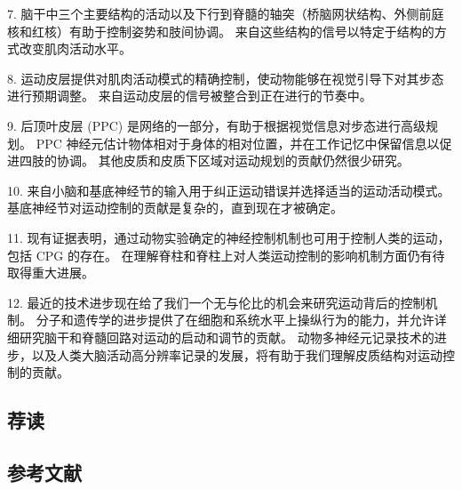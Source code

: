7. 脑干中三个主要结构的活动以及下行到脊髓的轴突（桥脑网状结构、外侧前庭核和红核）有助于控制姿势和肢间协调。 来自这些结构的信号以特定于结构的方式改变肌肉活动水平。 

8. 运动皮层提供对肌肉活动模式的精确控制，使动物能够在视觉引导下对其步态进行预期调整。 来自运动皮层的信号被整合到正在进行的节奏中。

9. 后顶叶皮层 (PPC) 是网络的一部分，有助于根据视觉信息对步态进行高级规划。 PPC 神经元估计物体相对于身体的相对位置，并在工作记忆中保留信息以促进四肢的协调。 其他皮质和皮质下区域对运动规划的贡献仍然很少研究。 

10. 来自小脑和基底神经节的输入用于纠正运动错误并选择适当的运动活动模式。 基底神经节对运动控制的贡献是复杂的，直到现在才被确定。 

11. 现有证据表明，通过动物实验确定的神经控制机制也可用于控制人类的运动，包括 CPG 的存在。 在理解脊柱和脊柱上对人类运动控制的影响机制方面仍有待取得重大进展。 

12. 最近的技术进步现在给了我们一个无与伦比的机会来研究运动背后的控制机制。 分子和遗传学的进步提供了在细胞和系统水平上操纵行为的能力，并允许详细研究脑干和脊髓回路对运动的启动和调节的贡献。 动物多神经元记录技术的进步，以及人类大脑活动高分辨率记录的发展，将有助于我们理解皮质结构对运动控制的贡献。

\subsection{荐读}
\subsection{参考文献}